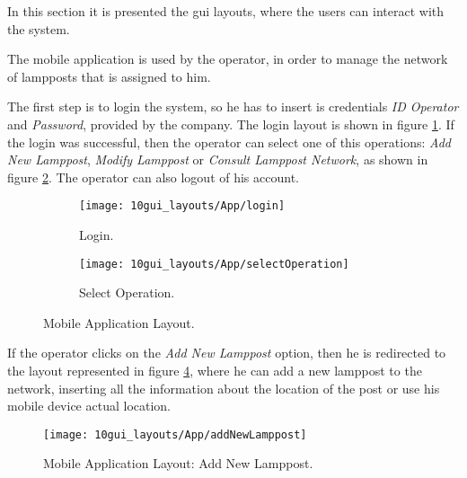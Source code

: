 In this section it is presented the \ac{gui} layouts, where the users can interact with the system.


The mobile application is used by the operator, in order to manage the network of lampposts that is assigned to him. 

The first step is to login the system, so he has to insert is credentials \textit{ID Operator} and \textit{Password}, provided by the company. The login layout is shown in figure \ref{fig:login}. If the login was successful, then the operator can select one of this operations: \textit{Add New Lamppost}, \textit{Modify Lamppost} or \textit{Consult Lamppost Network}, as shown in figure \ref{fig:selectOperation}. The operator can also logout of his account.



\begin{figure}[H]
	\centering
	\begin{subfigure}{.5\textwidth}
		\centering
		\texttt{[image: 10gui\_layouts/App/login]}
		\caption{Login.}
		\label{fig:login}
	\end{subfigure}%
	\begin{subfigure}{.5\textwidth}
		\centering
		\texttt{[image: 10gui\_layouts/App/selectOperation]}
		\caption{Select Operation.}
		\label{fig:selectOperation}
	\end{subfigure}
	\caption{Mobile Application Layout.}
	\label{fig:App}
\end{figure}

If the operator clicks on the \textit{Add New Lamppost} option, then he is redirected to the layout represented in figure \ref{fig:addNewLamppost}, where he can add a new lamppost to the network, inserting all the information about the location of the post or use his mobile device actual location. 

\begin{figure}[H]
	\centering	
	\texttt{[image: 10gui\_layouts/App/addNewLamppost]}
	\caption{Mobile Application Layout: Add New Lamppost.}
	\label{fig:addNewLamppost}
\end{figure}

